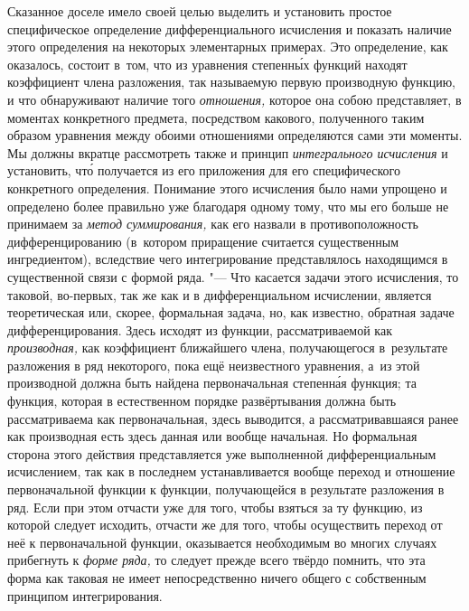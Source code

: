 Сказанное доселе имело своей целью выделить и установить простое специфическое
определение дифференциального исчисления и показать наличие этого определения
на некоторых элементарных примерах. Это определение, как оказалось, состоит
в~том, что из уравнения степенн\'{ы}х функций находят коэффициент члена разложения,
так называемую первую производную функцию, и что обнаруживают наличие того
{\em отношения,} которое она собою представляет, в моментах конкретного
предмета, посредством какового, полученного таким образом уравнения между
обоими отношениями определяются сами эти моменты. Мы должны вкратце рассмотреть
также и принцип {\em интегрального исчисления} и установить, чт\'{о} получается из
его приложения для его специфического конкретного определения. Понимание этого
исчисления было нами упрощено и определено более правильно уже благодаря одному
тому, что мы его больше не принимаем за {\em метод суммирования,} как его
назвали в противоположность дифференцированию (в~котором приращение считается
существенным ингредиентом), вследствие чего интегрирование представлялось
находящимся в существенной связи с формой ряда. "--- Что касается задачи этого
исчисления, то таковой, во-первых, так же как и в дифференциальном исчислении,
является теоретическая или, скорее, формальная задача, но, как известно,
обратная задаче дифференцирования. Здесь исходят из функции, рассматриваемой
как {\em производная,} как коэффициент ближайшего члена, получающегося
в~результате разложения в ряд некоторого, пока ещё неизвестного уравнения, а~из
этой производной должна быть найдена первоначальная степенн\'{а}я функция; та
функция, которая в естественном \label{bkm:bm53b}порядке развёртывания должна
быть рассматриваема как первоначальная, здесь выводится, а рассматривавшаяся
ранее как производная есть здесь данная или вообще начальная. Но формальная
сторона этого действия представляется уже выполненной дифференциальным
исчислением, так как в последнем устанавливается вообще переход и отношение
первоначальной функции к функции, получающейся в результате разложения в ряд.
Если при этом отчасти уже для того, чтобы взяться за ту функцию, из которой
следует исходить, отчасти же для того, чтобы осуществить переход от неё
к первоначальной функции, оказывается необходимым во многих случаях прибегнуть
к {\em форме ряда,} то следует прежде всего твёрдо помнить, что эта форма как
таковая не имеет непосредственно ничего общего с собственным принципом
интегрирования.

